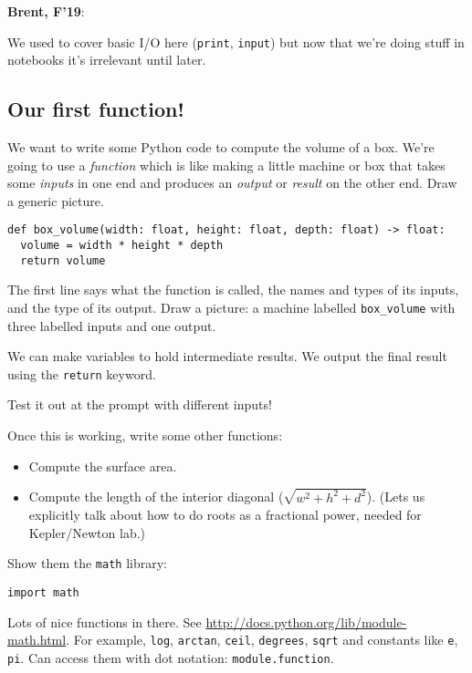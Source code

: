 \documentclass{article}
\newenvironment{reflect}[1]
{
  \noindent
  \begin{lrbox}{\reflectbox}
    \begin{minipage}[t]{\textwidth}
      \textbf{#1}:
}{
    \end{minipage}
  \end{lrbox}
  \fbox{\usebox{\reflectbox}}
}
\begin{document}
\begin{reflect}{Brent, F'19}
  We used to cover basic I/O here (\texttt{print}, \texttt{input}) but
  now that we're doing stuff in notebooks it's irrelevant until later.
\end{reflect}

\subsection*{Our first function!}

We want to write some Python code to compute the volume of a box.
We're going to use a \emph{function} which is like making a little
machine or box that takes some \emph{inputs} in one end and produces
an \emph{output} or \emph{result} on the other end.  Draw a generic
picture.

\begin{verbatim}
def box_volume(width: float, height: float, depth: float) -> float:
  volume = width * height * depth
  return volume
\end{verbatim}

The first line says what the function is called, the names and types
of its inputs, and the type of its output.  Draw a picture: a machine
labelled \verb|box_volume| with three labelled inputs and one
output.

We can make variables to hold intermediate results.  We output the
final result using the \verb|return| keyword.

Test it out at the prompt with different inputs!

Once this is working, write some other functions:
\begin{itemize}
\item Compute the surface area.
\item Compute the length of the interior diagonal
  ($\sqrt{w^2 + h^2 + d^2}$).  (Lets us explicitly talk about how to do
  roots as a fractional power, needed for Kepler/Newton lab.)
\end{itemize}

Show them the \verb|math| library:

\begin{verbatim}
import math
\end{verbatim}

Lots of nice functions in there.  See
\url{http://docs.python.org/lib/module-math.html}.  For example,
\verb|log|, \verb|arctan|, \verb|ceil|, \verb|degrees|, \verb|sqrt|
and constants like \verb|e|, \verb|pi|.  Can access them with dot
notation: \verb|module.function|.
\end{document}
